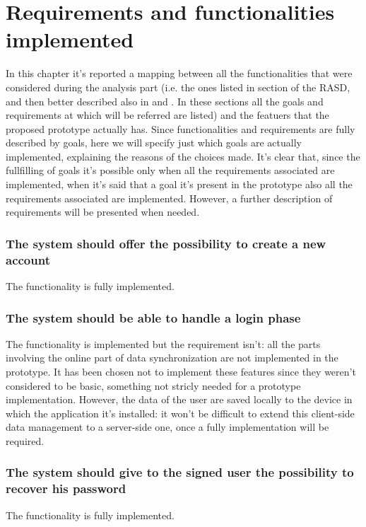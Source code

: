 \chapter{Requirements and functionalities implemented}

In this chapter it's reported a mapping between all the functionalities that were considered during the analysis part (i.e. the ones listed in section  of the RASD, and then better described also in  and . In these sections all the goals and requirements at which will be referred are listed) and the featuers that the proposed prototype actually has. Since functionalities and requirements are fully described by goals, here we will specify just which goals are actually implemented, explaining the reasons of the choices made.
It's clear that, since the fullfilling of goals it's possible only when all the requirements associated are implemented, when it's said that a goal it's present in the prototype also all the requirements associated are implemented.
However, a further description of requirements will be presented when needed.

\subsection{The system should offer the possibility to create a new account} \label{subsect:gNewAccount}
The functionality is fully implemented.

\subsection{The system should be able to handle a login phase} \label{subsect:gLoginPhase}
The functionality is implemented but the requirement  isn't: all the parts involving the online part of data synchronization are not implemented in the prototype. It has been chosen not to implement these features since they weren't considered to be basic, something not stricly needed for a prototype implementation. However, the data of the user are saved locally to the device in which the application it's installed: it won't be difficult to extend this client-side data management to a server-side one, once a fully implementation will be required.

\subsection{The system should give to the signed user the possibility to recover his password} \label{subsect:gPasswordRecovery}
The functionality is fully implemented.

